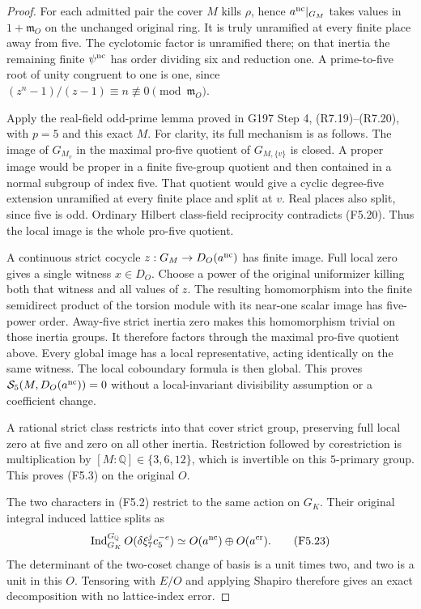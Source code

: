 \begin{proof}
For each admitted pair the cover $M$ kills $\rho$, hence
$a^{\rm nc}|_{G_M}$ takes values in $1+\mathfrak m_O$ on the
unchanged original ring. It is truly unramified at every finite
place away from five. The cyclotomic factor is unramified there;
on that inertia the remaining finite $\psi^{\rm nc}$ has
order dividing six and reduction one. A prime-to-five root
of unity congruent to one is one, since
$(z^n-1)/(z-1)\equiv n\not\equiv0\pmod{\mathfrak m_O}$.

Apply the real-field odd-prime lemma proved in G197 Step 4,
(R7.19)--(R7.20), with $p=5$ and this exact $M$.
For clarity, its full mechanism is as follows.
The image of $G_{M_v}$ in the maximal pro-five quotient of
$G_{M,\{v\}}$ is closed. A proper image would be proper in a
finite five-group quotient and then contained in a normal
subgroup of index five. That quotient would give a cyclic
degree-five extension unramified at every finite place and
split at $v$. Real places also split, since five is odd.
Ordinary Hilbert class-field reciprocity contradicts (F5.20).
Thus the local image is the whole pro-five quotient.

A continuous strict cocycle $z:G_M\to D_O(a^{\rm nc})$ has
finite image. Full local zero gives a single witness $x\in D_O$.
Choose a power of the original uniformizer killing both that
witness and all values of $z$. The resulting homomorphism into
the finite semidirect product of the torsion module with its
near-one scalar image has five-power order.
Away-five strict inertia zero makes this homomorphism trivial
on those inertia groups. It therefore factors through the
maximal pro-five quotient above. Every global image has a
local representative, acting identically on the same witness.
The local coboundary formula is then global.
This proves $\mathcal S_5(M,D_O(a^{\rm nc}))=0$ without a
local-invariant divisibility assumption or a coefficient change.

A rational strict class restricts into that cover strict group,
preserving full local zero at five and zero on all other inertia.
Restriction followed by corestriction is multiplication by
$[M:\mathbb Q]\in\{3,6,12\}$, which is invertible on this
$5$-primary group. This proves (F5.3) on the original $O$.

The two characters in (F5.2) restrict to the same action on
$G_K$. Their original integral induced lattice splits as
\[
 \operatorname{Ind}_{G_K}^{G_{\mathbb Q}}
           O(\delta\xi_7^j c_5^{-e})
                  \simeq O(a^{\rm nc})\oplus O(a^{\rm cr}).
 \tag{F5.23}
\]
The determinant of the two-coset change of basis is a unit
times two, and two is a unit in this $O$.
Tensoring with $E/O$ and applying Shapiro therefore gives
an exact decomposition with no lattice-index error.


\end{proof}

